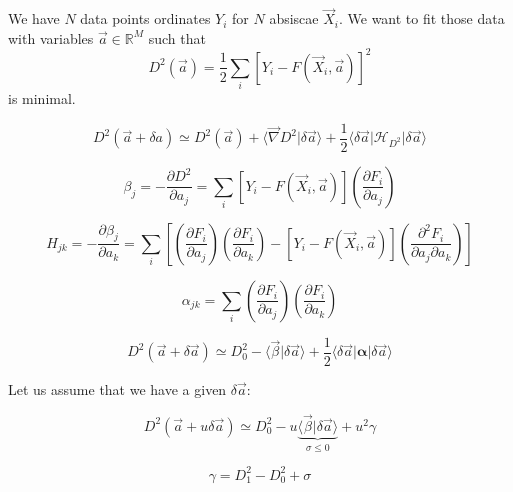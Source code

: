 \documentclass[aps,12pt]{revtex4}
\begin{document}
We have $N$ data points ordinates $Y_i$ for $N$ absiscae $\vec X_i$.
We want to fit those data with variables $\vec a \in \mathbb R^M$
such that
\begin{equation}
	D^2(\vec a) = \dfrac{1}{2} \sum_i \left[ Y_i - F(\vec X_i,\vec a) \right]^2 
\end{equation}
is minimal.

\begin{equation}
	D^2(\vec a + \delta a) \simeq D^2(\vec a) + \langle \vec \nabla D^2 \vert \delta \vec a \rangle
	 + \dfrac{1}{2} \langle \delta \vec a \vert \mathcal H_{D^2} \vert \delta \vec a\rangle
\end{equation}
	
\begin{equation}
	\beta_j = - \dfrac{\partial D^2}{\partial a_j} = \sum_i \left[ Y_i - F(\vec X_i,\vec a) \right] \left( \dfrac{\partial F_i}{\partial a_j} \right)
\end{equation}

\begin{equation}
	H_{jk} = - \dfrac{\partial \beta_j}{\partial a_k} = 
	\sum_i \left[ \left( \dfrac{\partial F_i}{\partial a_j} \right) \left( \dfrac{\partial F_i}{\partial a_k} \right) - \left[ Y_i - F(\vec X_i,\vec a) \right] \left( \dfrac{\partial^2 F_i}{\partial a_j\partial a_k} \right) \right]
\end{equation}

\begin{equation}
	\alpha_{jk} = \sum_i \left( \dfrac{\partial F_i}{\partial a_j} \right) \left( \dfrac{\partial F_i}{\partial a_k} \right)
\end{equation}

\begin{equation}
	D^2(\vec a + \delta \vec a) \simeq D^2_0 - \langle \vec \beta \vert \delta \vec a \rangle + \dfrac{1}{2}  \langle \delta \vec a \vert \bm{\alpha} \vert \delta \vec a\rangle
\end{equation}

Let us assume that we have a given $\delta \vec a$:

\begin{equation}
	D^2(\vec a + u \delta \vec a) \simeq D^2_0 - u \underbrace{\langle \vec \beta \vert \delta \vec a \rangle}_{\sigma \leq 0} + u^2 \gamma
\end{equation}

\begin{equation}
	\gamma = D^2_1 - D^2_0 + \sigma
\end{equation}
\end{document}
